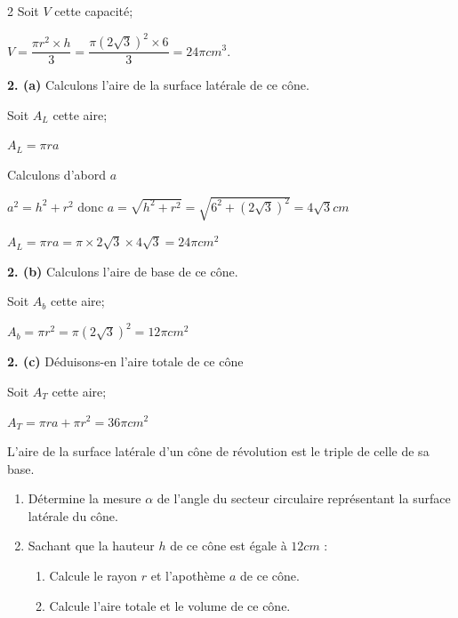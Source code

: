 \begin{multicols*}{2}
  	Soit $V$ cette capacité;
  	
  	$V=\dfrac{\pi r^2 \times h}{3}=\dfrac{\pi \left(2\sqrt{3}\right)^2 \times 6}{3}=24\pi cm^{3}$.
  	
  	\textbf{2. (a)} Calculons l'aire de la surface latérale de ce cône.
  	
  	Soit $A_{L}$ cette aire;
  	
  	$A_{L}=\pi r a$
  	
  	Calculons d'abord $a$
  	
  	$a^2=h^2+r^2$ donc $a=\sqrt{h^2+r^2}=\sqrt{6^2+\left(2\sqrt{3}\right)^2}=4\sqrt{3} cm$
  	
  	$A_{L}=\pi r a=\pi \times 2\sqrt{3}\times4\sqrt{3}=24\pi cm^{2}$
  	
  	\textbf{2. (b)} Calculons l'aire de base de ce cône.
  	
  	Soit $A_{b}$ cette aire;
  	
  	$A_{b}=\pi r^2= \pi \left(2\sqrt{3}\right)^2=12\pi cm^{2} $
  	
  	\textbf{2. (c)} Déduisons-en l'aire totale de ce cône
  	
  	Soit $A_{T}$ cette aire;
  	
  	$A_{T}=\pi r a+\pi r^2= 36\pi cm^{2} $
  	\begin{center}
  	\end{center}
  	\begin{center}
  	\end{center}
  	L'aire de la surface latérale d'un cône de révolution est le triple de celle de sa base.
  	\begin{enumerate}
  		\item Détermine la mesure $\alpha$  de l'angle  du secteur circulaire représentant la surface latérale du cône.
  		\item  Sachant que la hauteur $h$ de ce cône est égale à $12 cm$ :
  		\begin{enumerate}
  			\item  Calcule le rayon $r$ et l'apothème $a$ de ce cône.
  			\item  Calcule l'aire totale et le volume de ce cône.
  		\end{enumerate}
  	\end{enumerate}
  	

\end{multicols*}
